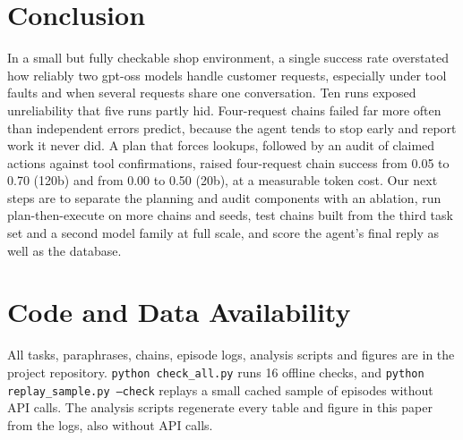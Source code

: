 \documentclass[10pt,a4paper,twocolumn]{article}
\begin{document}
\section{Conclusion}
In a small but fully checkable shop environment, a single success rate overstated how reliably two gpt-oss models handle
customer requests, especially under tool faults and when several requests share one conversation. Ten runs exposed
unreliability that five runs partly hid. Four-request chains failed far more often than independent errors predict,
because the agent tends to stop early and report work it never did. A plan that forces lookups, followed by an audit of
claimed actions against tool confirmations, raised four-request chain success from 0.05 to 0.70 (120b) and from 0.00 to
0.50 (20b), at a measurable token cost. Our next steps are to separate the planning and audit components with an
ablation, run plan-then-execute on more chains and seeds, test chains built from the third task set and a second model
family at full scale, and score the agent's final reply as well as the database.

\section*{Code and Data Availability}
All tasks, paraphrases, chains, episode logs, analysis scripts and figures are in the project repository.
\texttt{python check\_all.py} runs 16 offline checks, and \texttt{python replay\_sample.py --check} replays a small
cached sample of episodes without API calls. The analysis scripts regenerate every table and figure in this paper from
the logs, also without API calls.
\end{document}
